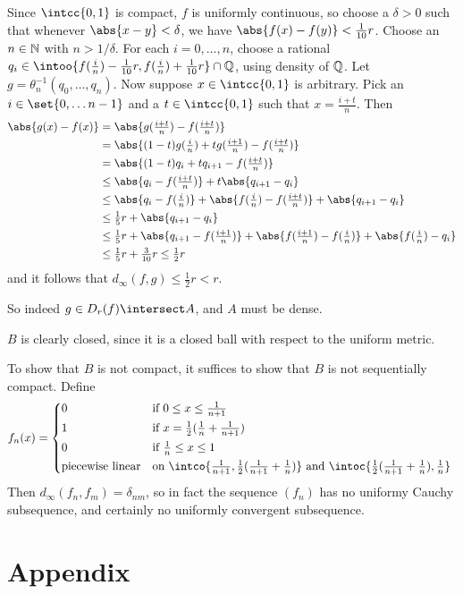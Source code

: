 \documentclass[a4paper,12pt,fleqn]{article}
\begin{document}
\begin{enumerate}[label=\arabic*.,leftmargin=*]
  Since \(\intcc{0, 1}\) is compact, \(f\) is uniformly continuous, so choose a
  \(\delta > 0\) such that whenever \(\abs{x - y} < \delta\), we have
  \(\abs{f(x) - f(y)} < \tfrac 1{10} r\). Choose an \(n \in \mathbb N\) with
  \(n > 1/\delta\). For each \(i = 0, \dotsc, n\), choose a rational
  \(q_i \in
    \intoo{f(\tfrac in) - \tfrac 1{10} r, f(\tfrac in) + \tfrac 1{10}r}
    \cap \Q\), using density of \(\mathbb Q\).
  Let \(g = \theta_n^{-1}(q_0, \dotsc, q_n)\).
  Now suppose \(x \in \intcc{0, 1}\) is arbitrary. Pick an
  \(i \in \set{0, \dotsc n - 1}\) and a \(t \in \intcc{0, 1}\) such that
  \(x = \tfrac{i + t}n\). Then
  \begin{align*}
   \abs{g(x) - f(x)}
    &= \abs{g(\tfrac{i + t}n) - f(\tfrac{i + t}n)} \\
    &= \abs{(1 - t)g(\tfrac in) + tg(\tfrac{i + 1}n) - f(\tfrac{i + t}n)} \\
    &= \abs{(1 - t)q_i + tq_{i + 1} - f(\tfrac{i + t}n)} \\
    &\le \abs{q_i - f(\tfrac{i + t}n)}
      + t\abs{q_{i + 1} - q_i} \\
    &\le \abs{q_i - f(\tfrac in)} + \abs{f(\tfrac in) - f(\tfrac{i + t}n)}
      + \abs{q_{i + 1} - q_i} \\
    &\le \tfrac 15 r
      + \abs{q_{i + 1} - q_i} \\
    &\le \tfrac 15 r
      + \abs{q_{i + 1} - f(\tfrac{i + 1}n)}
      + \abs{f(\tfrac{i + 1}n) - f(\tfrac in)}
      + \abs{f(\tfrac in) - q_i} \\
    &\le \tfrac 15 r + \tfrac 3{10} r \le \tfrac 12 r
  \end{align*}
  and it follows that \(d_\infty(f, g) \le \tfrac 12 r < r\).

  So indeed \(g \in D_r(f) \intersect A\), and \(A\) must be dense.

  \(B\) is clearly closed, since it is a closed ball with respect to the
  uniform metric.

  To show that \(B\) is not compact, it suffices to show that \(B\) is not
  sequentially compact. Define
  \begin{equation*}
   f_n(x) =
   \begin{cases*}
    0 & if \(0 \le x \le \tfrac 1{n + 1}\) \\
    1 & if \(x = \tfrac 12(\tfrac 1n + \tfrac 1{n + 1})\) \\
    0 & if \(\tfrac 1n \le x \le 1\) \\
    \text{piecewise linear}
     & on \(\intco{\tfrac 1{n + 1}, \tfrac 12(\tfrac 1{n + 1} + \tfrac 1n)}\)
       and \(\intoc{\tfrac 12(\tfrac 1{n + 1} + \tfrac 1n), \tfrac 1n}\)
   \end{cases*}
  \end{equation*}
  Then \(d_\infty(f_n, f_m) = \delta_{nm}\), so in fact the sequence
  \((f_n)\) has no uniformy Cauchy subsequence, and certainly no uniformly
  convergent subsequence.
\end{enumerate}

\section*{Appendix}

% 
% 
\end{document}
